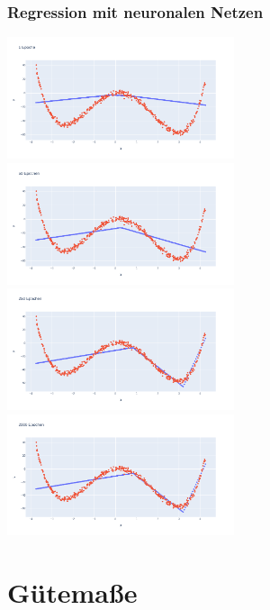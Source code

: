 
\begin{frame}
\frametitle{Regression mit neuronalen Netzen}

\begin{center}
	\includegraphics[width=0.5\textwidth]{fig7/nn_quartic_e1.png}%
	\includegraphics[width=0.5\textwidth]{fig7/nn_quartic_e50.png}
	\includegraphics[width=0.5\textwidth]{fig7/nn_quartic_e250.png}%
	\includegraphics[width=0.5\textwidth]{fig7/nn_quartic_e2000.png}
\end{center}

\end{frame}


\section{Gütemaße}



